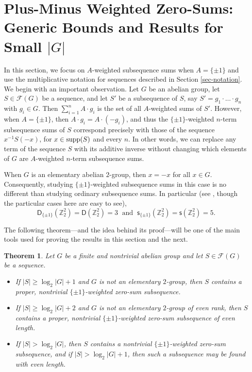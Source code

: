 \documentclass[11pt,reqno]{amsart}
\numberwithin{equation}{section}
\newtheorem{Theorem} {Theorem} [section]
\theoremstyle{definition}
\numberwithin{equation}{section}
\begin{document}
 \section{Plus-Minus Weighted Zero-Sums: Generic Bounds and Results for Small
$|G|$}\label{sec-small-values}

In this section,  we focus on $A$-weighted subsequence sums when $A=\{\pm
1\}$ and use the  multiplicative notation for sequences described in
Section \ref{sec-notation}. We begin with an important observation.
Let $G$ be an  abelian group, let $S\in {\mathcal F}(G)$ be a sequence, and let
$S'$ be a  subsequence of $S$, say $S'=g_1\cdot\ldots\cdot g_n$ with
$g_i\in G$.  Then ${\sum_{{i=1}}^{{n}}}A\cdot g_i$ is the set of all  $A$-weighted
 sums of  $S'$. However, when $A=\{\pm 1\}$, then
$A\cdot  g_i=A\cdot (-g_i)$, and thus the $\{\pm 1\}$-weighted
$n$-term subsequence  sums of $S$ correspond precisely with those of
the sequence  $x^{-1}S(-x)$, for $x\in {\text{\rm supp}}(S)$ and every $n$. In
other words, we can replace  any term of the sequence $S$ with its
additive inverse without changing which elements of $G$ are
$A$-weighted $n$-term subsequence sums.

When $G$ is an  elementary abelian $2$-group, then $x=-x$ for all $x\in
G$. Consequently,  studying $\{\pm 1\}$-weighted subsequence sums in this
case is no different  than studying ordinary subsequence sums. In
particular (see \cite{Ols0} \cite{Rei}, though the particular cases here are
easy to see),  \begin{equation}\label{value-22}\mathsf D_{\{\pm 1\}}({\mathbb Z}_2^2)
=\mathsf  D({\mathbb Z}_2^2)=3 {\;\mbox{ and } \;} \mathsf s_{\{\pm 1\}}({\mathbb Z}_2^2)=\mathsf s({\mathbb Z}_2^2)=5.\end{equation}

The following theorem---and the idea behind its proof---will be one
of the main tools used for proving the results in this section and
the next.

\begin{Theorem}\label{lemma-getzerosums} Let  $G$ be a finite and nontrivial
abelian group and let $S\in {\mathcal F}(G)$ be a sequence.

\begin{itemize}

\item[(i)] If $|S|\geq \log_2 |G|+1$ and  $G$ is not an elementary
$2$-group, then $S$ contains a proper,
nontrivial $\{\pm 1\}$-weighted zero-sum subsequence.
    \item[(ii)] If $|S|\geq \log_2 |G|+2$  and $G$ is not an elementary
$2$-group of even rank,
    then $S$ contains a proper, nontrivial  $\{\pm 1\}$-weighted zero-sum
subsequence of even length.
    \item[(iii)] If $|S|>\log_2 |G|$, then $S$ contains a
nontrivial $\{\pm 1\}$-weighted zero-sum  subsequence, and if $|S|>\log_2
|G|+1$, then such a subsequence may be found with even length.
\end{itemize}
\end{Theorem}
\end{document}
